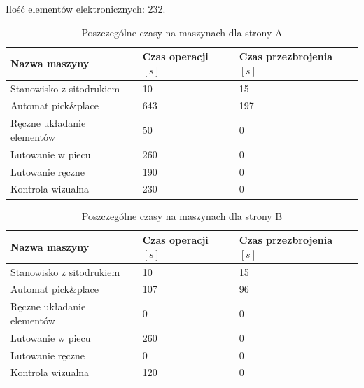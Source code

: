 \breakparagraph{}
Ilość elementów elektronicznych: 232.

\begin{table}[H]
	\centering
	\caption{Poszczególne czasy na maszynach dla strony A}
	\begin{tabular}{lll}
		\toprule
		Nazwa maszyny                 & Czas operacji $[s]$ & Czas przezbrojenia $[s]$ \\
		\midrule
		Stanowisko z sitodrukiem      & 10                  & 15                       \\
		Automat pick\&place           & 643                 & 197                      \\
		Ręczne układanie elementów & 50                  & 0                        \\
		Lutowanie w piecu             & 260                 & 0                        \\
		Lutowanie ręczne             & 190                 & 0                        \\
		Kontrola wizualna             & 230                 & 0                        \\
		\bottomrule
	\end{tabular}
\end{table}

\begin{table}[H]
	\centering
	\caption{Poszczególne czasy na maszynach dla strony B}
	\begin{tabular}{lll}
		\toprule
		Nazwa maszyny                 & Czas operacji $[s]$ & Czas przezbrojenia $[s]$ \\
		\midrule
		Stanowisko z sitodrukiem      & 10                  & 15                       \\
		Automat pick\&place           & 107                 & 96                       \\
		Ręczne układanie elementów & 0                   & 0                        \\
		Lutowanie w piecu             & 260                 & 0                        \\
		Lutowanie ręczne             & 0                   & 0                        \\
		Kontrola wizualna             & 120                 & 0                        \\
		\bottomrule
	\end{tabular}
\end{table}

